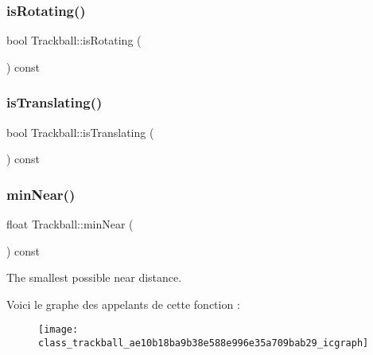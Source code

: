 \subsubsection{\texorpdfstring{is\+Rotating()}{isRotating()}}
{\footnotesize\ttfamily bool Trackball\+::is\+Rotating (\begin{DoxyParamCaption}{ }\end{DoxyParamCaption}) const}

\mbox{\label{class_trackball_ab60138170269b87ee0c131a978e98c4b}} 
\subsubsection{\texorpdfstring{is\+Translating()}{isTranslating()}}
{\footnotesize\ttfamily bool Trackball\+::is\+Translating (\begin{DoxyParamCaption}{ }\end{DoxyParamCaption}) const}

\mbox{\label{class_trackball_ae10b18ba9b38e588e996e35a709bab29}} 
\subsubsection{\texorpdfstring{min\+Near()}{minNear()}}
{\footnotesize\ttfamily float Trackball\+::min\+Near (\begin{DoxyParamCaption}{ }\end{DoxyParamCaption}) const}



The smallest possible near distance. 

Voici le graphe des appelants de cette fonction \+:
\nopagebreak
\begin{figure}[H]
\begin{center}
\leavevmode
\texttt{[image: class\_trackball\_ae10b18ba9b38e588e996e35a709bab29\_icgraph]}
\end{center}
\end{figure}
\mbox{\label{class_trackball_ac50d8b300e7c77162c6134986f9a8a50}} 
